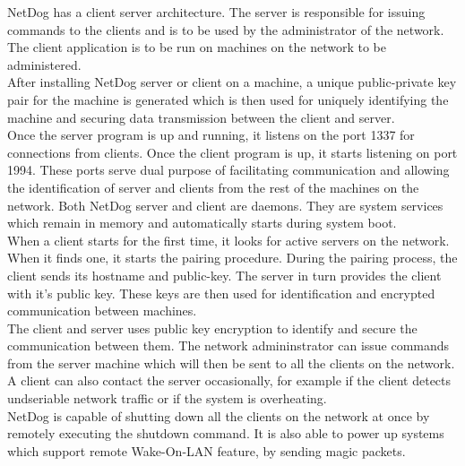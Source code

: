 \documentclass{scrreprt}
\begin{document}
NetDog has a client server architecture. The server is responsible for issuing
commands to the clients and is to be used by the administrator of the network.
The client application is to be run on machines on the network to be
administered.\\

After installing NetDog server or client on a machine, a unique public-private
key pair for the machine is generated which is then used for uniquely
identifying the machine and securing data transmission between the client and
server.\\

Once the server program is up and running, it listens on the port 1337 for
connections from clients. Once the client program is up, it starts listening on
port 1994. These ports serve dual purpose of facilitating communication and
allowing the identification of server and clients from the rest of the machines
on the network. Both NetDog server and client are daemons. They are system 
services which remain in memory and automatically starts during system boot.\\

When a client starts for the first time, it looks for active servers on the
network. When it finds one, it starts the pairing procedure. During the pairing
process, the client sends its hostname and public-key. The server in turn
provides the client with it's public key. These keys are then used for
identification and encrypted communication between machines.\\

The client and server uses public key encryption to identify and secure the
communication between them. The network admininstrator can issue commands from
the server machine which will then be sent to all the clients on the network.
A client can also contact the server occasionally, for example if the client
detects undseriable network traffic or if the system is overheating.\\

NetDog is capable of shutting down all the clients on the network at once by
remotely executing the shutdown command. It is also able to power up systems
which support remote Wake-On-LAN feature, by sending magic packets.\\
\end{document}
